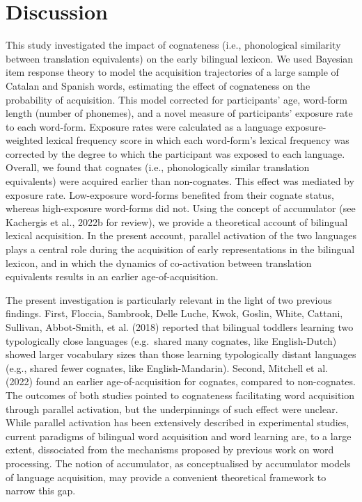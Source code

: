 \documentclass[
  12pt,
  b5paperpaper,
  twoside]{scrreprt}
\begin{document}
\hypertarget{sec-discussion}{%
\section{Discussion}\label{sec-discussion}}

This study investigated the impact of cognateness (i.e., phonological
similarity between translation equivalents) on the early bilingual
lexicon. We used Bayesian item response theory to model the acquisition
trajectories of a large sample of Catalan and Spanish words, estimating
the effect of cognateness on the probability of acquisition. This model
corrected for participants' age, word-form length (number of phonemes),
and a novel measure of participants' exposure rate to each word-form.
Exposure rates were calculated as a language exposure-weighted lexical
frequency score in which each word-form's lexical frequency was
corrected by the degree to which the participant was exposed to each
language. Overall, we found that cognates (i.e., phonologically similar
translation equivalents) were acquired earlier than non-cognates. This
effect was mediated by exposure rate. Low-exposure word-forms benefited
from their cognate status, whereas high-exposure word-forms did not.
Using the concept of accumulator (see Kachergis et al., 2022b for
review), we provide a theoretical account of bilingual lexical
acquisition. In the present account, parallel activation of the two
languages plays a central role during the acquisition of early
representations in the bilingual lexicon, and in which the dynamics of
co-activation between translation equivalents results in an earlier
age-of-acquisition.

The present investigation is particularly relevant in the light of two
previous findings. First, Floccia, Sambrook, Delle Luche, Kwok, Goslin,
White, Cattani, Sullivan, Abbot‐Smith, et al. (2018) reported that
bilingual toddlers learning two typologically close languages
(e.g.~shared many cognates, like English-Dutch) showed larger vocabulary
sizes than those learning typologically distant languages (e.g., shared
fewer cognates, like English-Mandarin). Second, Mitchell et al. (2022)
found an earlier age-of-acquisition for cognates, compared to
non-cognates. The outcomes of both studies pointed to cognateness
facilitating word acquisition through parallel activation, but the
underpinnings of such effect were unclear. While parallel activation has
been extensively described in experimental studies, current paradigms of
bilingual word acquisition and word learning are, to a large extent,
dissociated from the mechanisms proposed by previous work on word
processing. The notion of accumulator, as conceptualised by accumulator
models of language acquisition, may provide a convenient theoretical
framework to narrow this gap.
\end{document}
